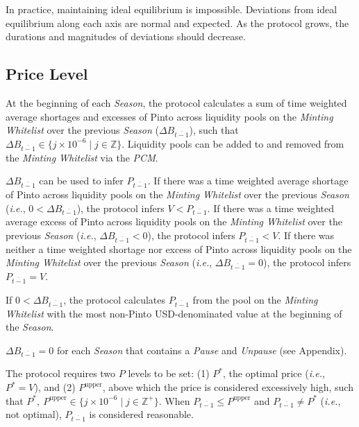 \documentclass[tikz]{article}
\newcommand{\term}[1]{\textsl{#1}}
\begin{document}
In practice, maintaining ideal equilibrium is impossible. Deviations from ideal equilibrium along each axis are normal and expected. As the protocol grows, the durations and magnitudes of deviations should decrease. 


\vspace*{2mm}
\subsection{Price Level}
\vspace*{2mm}

At the beginning of each \term{Season}, the protocol calculates a sum of time weighted average shortages and excesses of Pinto across liquidity pools on the \term{Minting Whitelist} over the previous \term{Season} ($\Delta B_{\overline{t-1}}$), such that $\Delta B_{\overline{t-1}} \in \{j \times 10^{-6} \mid j \in \mathbb{Z} \}$. Liquidity pools can be added to and removed from the \term{Minting Whitelist} via the \term{PCM}.

$\Delta B_{\overline{t-1}}$ can be used to infer $P_{\overline{t-1}}$. If there was a time weighted average shortage of Pinto across liquidity pools on the \term{Minting Whitelist} over the previous \term{Season} (\textit{i.e.}, $0 < \Delta B_{\overline{t-1}}$), the protocol infers $V < P_{\overline{t-1}}$. If there was a time weighted average excess of Pinto across liquidity pools on the \term{Minting Whitelist} over the previous \term{Season} (\textit{i.e.}, $\Delta B_{\overline{t-1}} < 0$), the protocol infers $P_{\overline{t-1}} < V$. If there was neither a time weighted shortage nor excess of Pinto across liquidity pools on the \term{Minting Whitelist} over the previous \term{Season} (\textit{i.e.}, $\Delta B_{\overline{t-1}} = 0$), the protocol infers $P_{\overline{t-1}} = V$. 

If $0 < \Delta B_{\overline{t-1}}$, the protocol calculates $P_{\overline{t-1}}$ from the pool on the \term{Minting Whitelist} with the most non-Pinto USD-denominated value at the beginning of the \term{Season}.

$\Delta B_{\overline{t-1}} = 0$ for each \term{Season} that contains a \term{Pause} and \term{Unpause} (see Appendix).

The protocol requires two $P$ levels to be set: (1) $P^{*}$, the optimal price (\textit{i.e.}, $P^{*} = V$), and (2) $P^{\text{upper}}$, above which the price is considered excessively high, such that $P^{*},\ P^{\text{upper}} \in \{j \times 10^{-6} \mid j \in \mathbb{Z}^{+} \}$. When $P_{\overline{t-1}} \leq P^{\text{upper}}$ and $P_{\overline{t-1}} \neq P^{*}$ (\textit{i.e.}, not optimal), $P_{\overline{t-1}}$ is considered reasonable.
\end{document}
